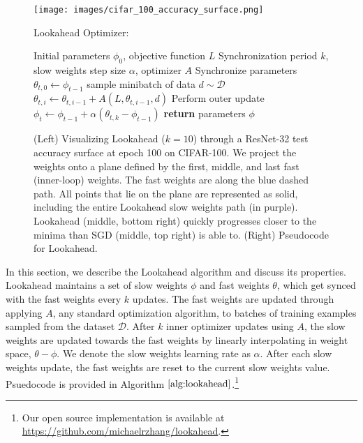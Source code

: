 \documentclass{article}
\begin{document}
\begin{figure}[t]
\centering
\vspace{-0.5cm}
\begin{minipage}{0.45\textwidth}
    \hspace{-0.3in}
    \texttt{[image: images/cifar\_100\_accuracy\_surface.png]}
        \vspace{-0.4cm}
\end{minipage}
\hfill
\hspace{-0.3in}
\begin{minipage}{0.55\textwidth}
\begin{algorithm}[H]
  \caption{Lookahead Optimizer:}
  \label{alg:lookahead}
\begin{algorithmic}
   \REQUIRE Initial parameters $\phi_0$, objective function $L$ 
   \REQUIRE Synchronization period $k$, slow weights step size $\alpha$, optimizer $A$
     \STATE Synchronize parameters $\theta_{t,0} \gets \phi_{t-1}$
        \STATE sample minibatch of data $d \sim \mathcal{D}$
        \STATE $\theta_{t,i} \gets \theta_{t,i-1} + A(L, \theta_{t,i-1}, d)$
     \ENDFOR
     \STATE Perform outer update $\phi_t \gets \phi_{t-1} + \alpha (\theta_{t,k} - \phi_{t-1})$
   \ENDFOR 
   \STATE \textbf{return} parameters $\phi$
\end{algorithmic}
\end{algorithm}
\end{minipage}
\vspace{0.1in}

\caption{({{Left}}) Visualizing Lookahead ($k=10$) through a ResNet-32 test accuracy surface at epoch 100 on CIFAR-100. We project the weights onto a plane defined by the first, middle, and last fast (inner-loop) weights. The fast weights are along the blue dashed path. All points that lie on the plane are represented as solid, including the entire Lookahead slow weights path (in purple). Lookahead (middle, bottom right) quickly progresses closer to the minima than SGD (middle, top right) is able to. ({{Right}}) Pseudocode for Lookahead. \label{fig:cifar_100_loss_viz}}
\end{figure}

In this section, we describe the Lookahead algorithm and discuss its properties. Lookahead maintains a set of slow weights $\phi$ and fast weights $\theta$, which get synced with the fast weights every $k$ updates. The fast weights are updated through applying $A$, any standard optimization algorithm, to batches of training examples sampled from the dataset $\mathcal{D}$. After $k$ inner optimizer updates using $A$, the slow weights are updated towards the fast weights by linearly interpolating in weight space, $\theta - \phi$. We denote the slow weights learning rate as $\alpha$. After each slow weights update, the fast weights are reset to the current slow weights value. Psuedocode is provided in Algorithm $\ref{alg:lookahead}$.\footnote{Our open source implementation is available at \url{https://github.com/michaelrzhang/lookahead}.}
\end{document}
